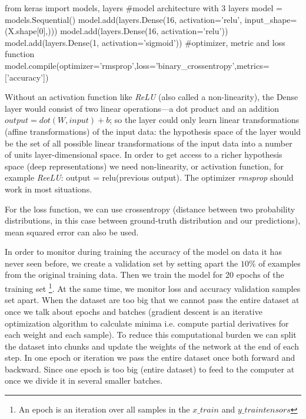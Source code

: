 \documentclass[11pt]{article}
\theoremstyle{definition}
\theoremstyle{remark}
\begin{document}
\begin{code}[caption=Deep network 3 layers, label=deepkeras]
from keras import models, layers
#model architecture with 3 layers
model = models.Sequential()
model.add(layers.Dense(16, activation='relu', input_shape=(X.shape[0],)))
model.add(layers.Dense(16, activation='relu'))
model.add(layers.Dense(1, activation='sigmoid'))
#optimizer, metric and loss function 
model.compile(optimizer='rmsprop',loss='binary_crossentropy',metrics=['accuracy'])
\end{code}
Without an activation function like \emph{ReLU} (also called a non-linearity), the Dense layer would consist of two linear operations—a dot product and an addition $output = dot(W, input) + b$; so the layer could only learn linear transformations (affine transformations) of the input data: the hypothesis space of the layer would be the set of all possible linear transformations of the input data into a number of units layer-dimensional space. 
In order to get access to a richer hypothesis space (deep representations) we need non-linearity, or activation function, for example \emph{ReeLU}: output = relu(previous output). The optimizer \textit{rmsprop} should work in most situations.

For the loss function, we can use crossentropy (distance between two probability distributions, in this case between ground-truth distribution and our predictions), mean squared error can also be used. 

In order to monitor during training the accuracy of the model on data it has never seen before, we create a validation set by setting apart the $10\%$ of examples from the original training data. Then we train the model for 20 epochs of the training set \footnote{An epoch is an iteration over all samples in the $x\_train$ and $y\_train tensors$}. At the same time, we monitor loss and accuracy validation samples set apart.
When the dataset are too big that we cannot pass the entire dataset at once we talk about epochs and batches (gradient descent  is an iterative optimization algorithm to calculate minima i.e. compute partial derivatives for each weight and each sample). To reduce this computational burden we can split the dataset into chunks and update the weights of the network at the end of each step. In one epoch or iteration we pass the entire dataset once both forward and backward. Since one epoch is too big (entire dataset) to feed to the computer at once we divide it in several smaller batches.
\end{document}
